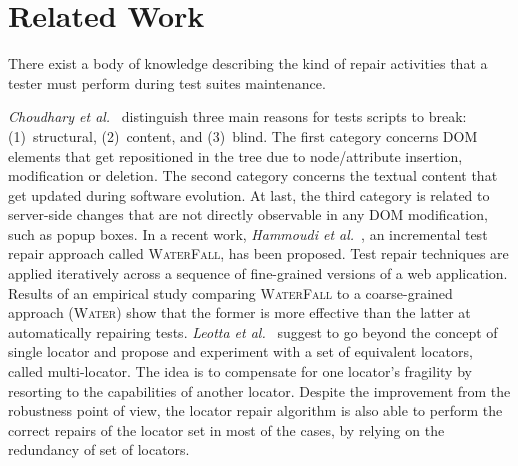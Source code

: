 \section{Related Work}\label{sec:relwork}



There exist a body of knowledge describing the kind of repair activities that a tester must perform during test suites maintenance. 

 \textit{Choudhary et al.}~\cite{Choudhary:2011:WWA:2002931.2002935} distinguish three main reasons for tests scripts to break: (1)~structural, (2)~content, and (3)~blind. The first category concerns DOM elements that get repositioned in the tree due to node/attribute insertion, modification or deletion. The second category concerns the textual content that get updated during software evolution. At last, the third category is related to server-side changes that are not directly observable in any DOM modification, such as popup boxes. 
%
In a recent work, \textit{Hammoudi et al.}~\cite{Hammoudi:2016:WIA:2950290.2950294}, an incremental test repair approach called \textsc{WaterFall}, has been proposed. Test repair techniques are applied iteratively across a sequence of fine-grained versions of a web application. Results of an empirical study comparing \textsc{WaterFall} to a coarse-grained approach (\textsc{Water}) show that the former is more effective than the latter at automatically repairing tests.
%
\textit{Leotta et al.}~\cite{2015-leotta-ICST} suggest to go beyond the concept of single locator and propose and experiment with a set of equivalent locators, called multi-locator. 
The idea is to compensate for one locator's fragility by resorting to the capabilities of another locator. Despite the improvement from the robustness point of view, the locator repair algorithm is also able to perform the correct repairs of the locator set in most of the cases, by relying on the redundancy of set of locators.


